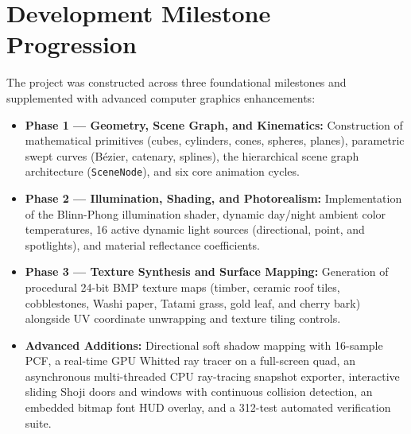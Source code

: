 \section{Development Milestone Progression}
The project was constructed across three foundational milestones and supplemented with advanced computer graphics enhancements:
\begin{itemize}
    \item \textbf{Phase 1 --- Geometry, Scene Graph, and Kinematics:} Construction of mathematical primitives (cubes, cylinders, cones, spheres, planes), parametric swept curves (B\'ezier, catenary, splines), the hierarchical scene graph architecture (\texttt{SceneNode}), and six core animation cycles.
    \item \textbf{Phase 2 --- Illumination, Shading, and Photorealism:} Implementation of the Blinn-Phong illumination shader, dynamic day/night ambient color temperatures, 16 active dynamic light sources (directional, point, and spotlights), and material reflectance coefficients.
    \item \textbf{Phase 3 --- Texture Synthesis and Surface Mapping:} Generation of procedural 24-bit BMP texture maps (timber, ceramic roof tiles, cobblestones, Washi paper, Tatami grass, gold leaf, and cherry bark) alongside UV coordinate unwrapping and texture tiling controls.
    \item \textbf{Advanced Additions:} Directional soft shadow mapping with 16-sample PCF, a real-time GPU Whitted ray tracer on a full-screen quad, an asynchronous multi-threaded CPU ray-tracing snapshot exporter, interactive sliding Shoji doors and windows with continuous collision detection, an embedded bitmap font HUD overlay, and a 312-test automated verification suite.
\end{itemize}
